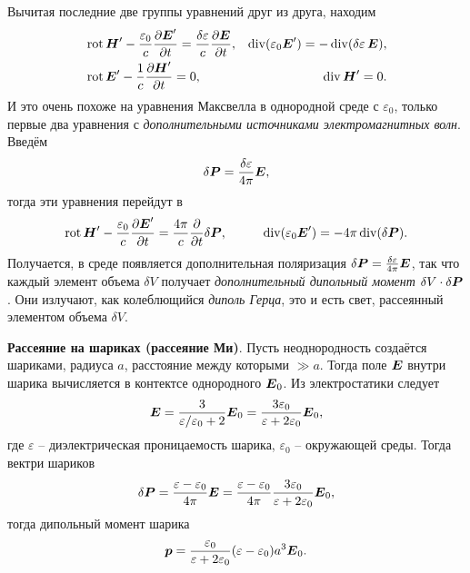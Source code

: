 Вычитая последние две группы уравнений друг из друга, находим
\begin{align*}
    &\mathop{\mathrm{rot}}\nolimits \mbox{\boldmath $H$}' - \frac{\varepsilon_0}{c} \frac{\partial \mbox{\boldmath $E$}'}{\partial t} = \frac{\delta \varepsilon}{c} \frac{\partial \mbox{\boldmath $E$}}{\partial t},  
    &\mathop{\mathrm{div}}\nolimits (\varepsilon_0 \mbox{\boldmath $E$}') = - \mathop{\mathrm{div}}\nolimits(\delta \varepsilon \, \mbox{\boldmath $E$}), \\
    &\mathop{\mathrm{rot}}\nolimits \mbox{\boldmath $E$}' - \frac{1}{c}\frac{\partial \mbox{\boldmath $H$}'}{\partial t} = 0, 
    &\mathop{\mathrm{div}}\nolimits \mbox{\boldmath $H$}' = 0.
    \label{eqO}
\end{align*}
И это очень похоже на уравнения Максвелла в однородной среде с $\varepsilon_0$, только первые два уравнения с \textit{дополнительными источниками электромагнитных волн}. Введём
\begin{equation*}
    \delta \mbox{\boldmath $P$} = \frac{\delta \varepsilon}{4\pi} \mbox{\boldmath $E$},
\end{equation*}
тогда эти уравнения перейдут в
\begin{equation*}
    \rot \vc{H}' - \frac{\varepsilon_0}{c} \frac{\partial \vc{E}'}{\partial t} = \frac{4\pi}{c} \frac{\partial }{\partial t} \delta \vc{P}, \hspace{10 mm} 
    \div(\varepsilon_0 \vc{E}') = - 4 \pi \div (\delta \vc{P}).
\end{equation*}
Получается, в среде появляется дополнительная поляризация $\delta \mbox{\boldmath $P$} = \frac{\delta \varepsilon}{4 \pi} \mbox{\boldmath $E$}$, так что каждый элемент объема $\delta V$ получает \textit{дополнительный дипольный момент} $\delta V \cdot \delta \mbox{\boldmath $P$}$. Они излучают, как колеблющийся \textit{диполь Герца}, это и есть свет, рассеянный элементом объема $\delta V$. 



\textbf{Рассеяние на шариках (рассеяние Ми)}.
Пусть неоднородность создаётся шариками, радиуса $a$, расстояние между которыми $\gg a$. Тогда поле $\mbox{\boldmath $E$}$ внутри шарика вычисляется в контектсе однородного $\mbox{\boldmath $E$}_0$. Из электростатики следует
\begin{equation*}
    \mbox{\boldmath $E$} = \frac{3}{\varepsilon/\varepsilon_0 + 2} \mbox{\boldmath $E$}_0 = \frac{3 \varepsilon_0}{\varepsilon + 2 \varepsilon_0} \mbox{\boldmath $E$}_0,
\end{equation*}
где $\varepsilon$ -- диэлектрическая проницаемость шарика, $\varepsilon_0$ -- окружающей среды. Тогда вектри шариков
\begin{equation*}
    \delta \mbox{\boldmath $P$} = \frac{\varepsilon-\varepsilon_0}{4\pi} \mbox{\boldmath $E$}
    = \frac{\varepsilon-\varepsilon_0}{4\pi}  \frac{3 \varepsilon_0}{\varepsilon + 2 \varepsilon_0} \mbox{\boldmath $E$}_0,
\end{equation*}
тогда дипольный момент шарика
\begin{equation*}
    \mbox{\boldmath $p$} = \frac{\varepsilon_0}{\varepsilon+2\varepsilon_0} (\varepsilon-\varepsilon_0) a^3 \mbox{\boldmath $E$}_0.
\end{equation*}



